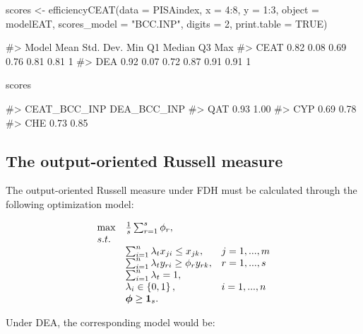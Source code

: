 \begin{Schunk}
\begin{Sinput}
scores <- efficiencyCEAT(data = PISAindex, x = 4:8, y = 1:3, object = modelEAT, 
                         scores_model = "BCC.INP", digits = 2, 
                         print.table = TRUE)
\end{Sinput}
\begin{Soutput}
#>  Model Mean Std. Dev.  Min   Q1 Median   Q3 Max
#>   CEAT 0.82      0.08 0.69 0.76   0.81 0.81   1
#>    DEA 0.92      0.07 0.72 0.87   0.91 0.91   1
\end{Soutput}
\begin{Sinput}
scores %>% sample_n(3)
\end{Sinput}
\begin{Soutput}
#>     CEAT_BCC_INP DEA_BCC_INP
#> QAT         0.93        1.00
#> CYP         0.69        0.78
#> CHE         0.73        0.85
\end{Soutput}
\end{Schunk}

\hypertarget{the-output-oriented-russell-measure}{%
\subsection{The output-oriented Russell
measure}\label{the-output-oriented-russell-measure}}

The output-oriented Russell measure under FDH must be calculated through
the following optimization model:

\begin{equation} \label{(19)} 
\begin{array}{lllll} 
{} & {\max } & {\frac{1}{s} \sum_{r=1}^{s}\phi_{r},} & {} & {} \\ 
{} & {s.t.} & {} & {} & {} \\ 
{} & {} & {\sum_{i=1}^{n}\lambda_{t} x_{ji}  \le x_{jk} ,} & {j=1,...,m} & {} \\ 
{} & {} & {\sum_{i=1}^{n}\lambda_{t} y_{ri}  \ge \phi_{r} y_{rk} ,} & {r=1,...,s} & {} \\ 
{} & {} & {\sum_{i=1}^{n}\lambda_{t}=1,} & {} & {} \\ 
{} & {} & {\lambda_{i} \in \left\{0,1\right\},} & {i=1,...,n} & {} \\ 
{} & {} & {{\it \boldsymbol{\phi}}\ge {\bf 1}_{s}.} 
\end{array}
\end{equation}

Under DEA, the corresponding model would be:

